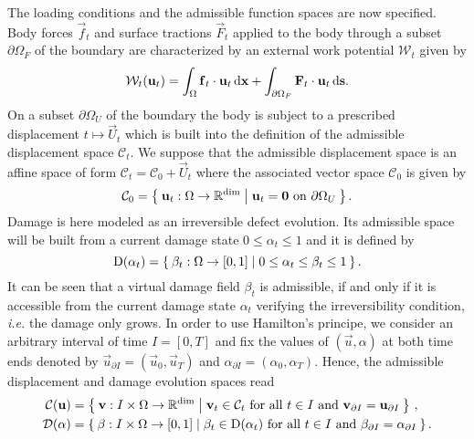 The loading conditions and the admissible function spaces are now specified. Body forces $\vec{f}_t$ and surface tractions $\vec{F}_t$ applied to the body through a subset $\partial\Omega_F$ of the boundary are characterized by an external work potential $\mathcal{W}_t$ given by
\begin{equation} \label{eq:power}
\mathcal{W}_t(\vec{u}_t)=\int_\Omega\vec{f}_t\cdot\vec{u}_t\dx+\int_{\partial\Omega_F}\vec{F}_t\cdot\vec{u}_t\D{\vec{s}}.
\end{equation}
On a subset $\partial\Omega_U$ of the boundary the body is subject to a prescribed displacement $t\mapsto \vec{U}_t$ which is built into the definition of the admissible displacement space $\mathcal{C}_t$. We suppose that the admissible displacement space is an affine space of form $\mathcal{C}_t=\mathcal{C}_0+\vec{U}_t$ where the associated vector space $\mathcal{C}_0$ is given by
\begin{equation} \label{eq:C0}
\mathcal{C}_0=\set{\vec{u}_t:\Omega\to\mathbb{R}^\mathrm{dim}|\vec{u}_t=\vec{0}\text{ on }\partial\Omega_U}.
\end{equation}
Damage is here modeled as an irreversible defect evolution. Its admissible space will be built from a current damage state $0\leq\alpha_t\leq 1$ and it is defined by
\begin{equation} \label{eq:Dalphat}
\mathrm{D}(\alpha_t)=\Set{\beta_t:\Omega\to[0,1]|0\leq\alpha_t\leq\beta_t\leq 1}.
\end{equation}
It can be seen that a virtual damage field $\beta_t$ is admissible, if and only if it is accessible from the current damage state $\alpha_t$ verifying the irreversibility condition, \emph{i.e.} the damage only grows. In order to use Hamilton's principe, we consider an arbitrary interval of time $I=[0,T]$ and fix the values of $(\vec{u},\alpha)$ at both time ends denoted by $\vec{u}_{\partial I}=(\vec{u}_0,\vec{u}_T)$ and $\alpha_{\partial I}=(\alpha_0,\alpha_T)$. Hence, the admissible displacement and damage evolution spaces read
\begin{align}
\mathcal{C}(\vec{u}) &= \set{\vec{v}:I\times\Omega\to\mathbb{R}^\mathrm{dim}|\vec{v}_t\in\mathcal{C}_t\text{ for all $t\in I$ and }\vec{v}_{\partial I}=\vec{u}_{\partial I}}\,, \label{eq:Du} \\
\mathcal{D}(\alpha) &= \set{\beta:I\times\Omega\to[0,1]|\beta_t\in\mathrm{D}(\alpha_t)\text{ for all $t\in I$ and }\beta_{\partial I}=\alpha_{\partial I}}. \label{eq:Dalpha}
\end{align}

